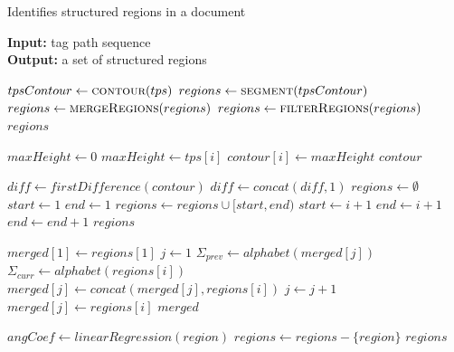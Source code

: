 \documentclass{vldb}
\begin{document}
\begin{algorithm}
\caption{Identifies structured regions in a document}
\label{alg:idreg}
\textbf{Input:} tag path sequence \\
\textbf{Output:} a set of structured regions

\begin{algorithmic}[1]

 
\State $tpsContour \leftarrow \Call{contour}{tps}$
\State $regions \leftarrow \Call{segment}{tpsContour}$
\State $regions \leftarrow \Call{mergeRegions}{regions}$
\State $regions \leftarrow \Call{filterRegions}{regions}$
\State \Return $regions$
\EndFunction


 
\State $maxHeight \leftarrow 0$ 
\State $maxHeight \leftarrow tps[i]$ 
\EndIf 
\State $contour[i] \leftarrow maxHeight$ 
\EndFor 
\State \Return $contour$ 
\EndFunction


 
\State $diff \leftarrow firstDifference(contour)$
\State $diff \leftarrow concat(diff, 1)$
\State $regions \leftarrow \emptyset$
\State $start \leftarrow 1$
\State $end \leftarrow 1$
\State $regions \leftarrow regions \cup [start, end)$
\EndIf
\State $start \leftarrow i + 1$
\State $end \leftarrow i + 1$
\Else
\State $end \leftarrow end + 1$
\EndIf
\EndFor
\State \Return $regions$
\EndFunction


 
\State $merged[1] \leftarrow regions[1]$ 
\State $j \leftarrow 1$ 
\State $\Sigma_{prev} \leftarrow alphabet(merged[j])$ 
\State $\Sigma_{curr} \leftarrow alphabet(regions[i])$
\State $merged[j] \leftarrow concat(merged[j], regions[i])$
\Else 
\State $j \leftarrow j + 1$ 
\State $merged[j] \leftarrow regions[i]$ 
\EndIf 
\EndFor 
\State 
\Return $merged$ 
\EndFunction


 
\State $angCoef \leftarrow linearRegression(region)$
\State $regions \leftarrow regions - \{region\}$
\EndIf
\EndFor
\State \Return $regions$
\EndFunction

\end{algorithmic}
\end{algorithm}
\end{document}
